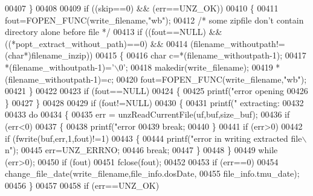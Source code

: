 \begin{DoxyCode}
{{{{{{{{{{{{{00407         \}
00408 
00409         \textcolor{keywordflow}{if} ((skip==0) && (err==UNZ\_OK))
00410         \{
00411             fout=FOPEN\_FUNC(write\_filename,\textcolor{stringliteral}{"wb"});
00412             \textcolor{comment}{/* some zipfile don't contain directory alone before file */}
00413             \textcolor{keywordflow}{if} ((fout==NULL) && ((*popt\_extract\_without\_path)==0) &&
00414                                 (filename\_withoutpath!=(\textcolor{keywordtype}{char}*)filename\_inzip))
00415             \{
00416                 \textcolor{keywordtype}{char} c=*(filename\_withoutpath-1);
00417                 *(filename\_withoutpath-1)=\textcolor{charliteral}{'\(\backslash\)0'};
00418                 makedir(write\_filename);
00419                 *(filename\_withoutpath-1)=c;
00420                 fout=FOPEN\_FUNC(write\_filename,\textcolor{stringliteral}{"wb"});
00421             \}
00422 
00423             \textcolor{keywordflow}{if} (fout==NULL)
00424             \{
00425                 printf(\textcolor{stringliteral}{"error opening %
00426             \}
00427         \}
00428 
00429         \textcolor{keywordflow}{if} (fout!=NULL)
00430         \{
00431             printf(\textcolor{stringliteral}{" extracting: %
00432 
00433             \textcolor{keywordflow}{do}
00434             \{
00435                 err = unzReadCurrentFile(uf,buf,size\_buf);
00436                 \textcolor{keywordflow}{if} (err<0)
00437                 \{
00438                     printf(\textcolor{stringliteral}{"error %
00439                     \textcolor{keywordflow}{break};
00440                 \}
00441                 \textcolor{keywordflow}{if} (err>0)
00442                     \textcolor{keywordflow}{if} (fwrite(buf,err,1,fout)!=1)
00443                     \{
00444                         printf(\textcolor{stringliteral}{"error in writing extracted file\(\backslash\)n"});
00445                         err=UNZ\_ERRNO;
00446                         \textcolor{keywordflow}{break};
00447                     \}
00448             \}
00449             \textcolor{keywordflow}{while} (err>0);
00450             \textcolor{keywordflow}{if} (fout)
00451                     fclose(fout);
00452 
00453             \textcolor{keywordflow}{if} (err==0)
00454                 change\_file\_date(write\_filename,file\_info.dosDate,
00455                                  file\_info.tmu\_date);
00456         \}
00457 
00458         \textcolor{keywordflow}{if} (err==UNZ\_OK)
}}}}}}}}}}}}}}}}
\end{DoxyCode}
